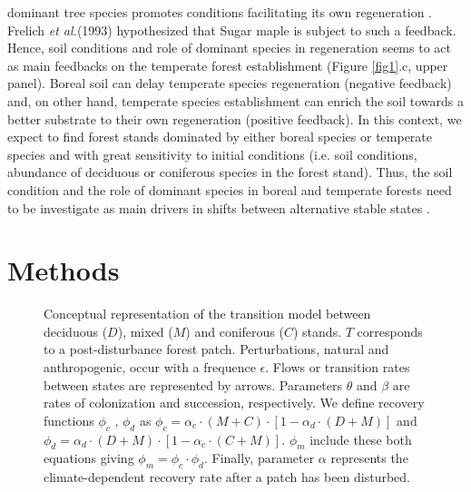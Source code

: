 dominant tree species promotes conditions facilitating its own regeneration
\cite{Barras1998}. Frelich \textit{et al.}(1993) \cite{Society2014}
hypothesized that Sugar maple is subject to such a feedback. Hence, soil
conditions and role of dominant species in regeneration seems to act as main
feedbacks on the temperate forest establishment (Figure \ref{fig1}.c, upper
panel). Boreal soil can delay temperate species regeneration (negative
feedback) and, on other hand, temperate species establishment can enrich the
soil towards a better substrate to their own regeneration (positive feedback).
In this context, we expect to find forest stands dominated by either boreal
species or temperate species and with great sensitivity to initial conditions
(i.e. soil conditions, abundance of deciduous or coniferous
species in the forest stand). Thus, the soil condition and the role of
dominant species in boreal and temperate forests need to be investigate as main
drivers in shifts between alternative stable states
\cite{Kellman2004,Moore2008,DeFrenne2013,Barras1998}.

\section{Methods}

\begin{figure}

\caption{Conceptual representation of the transition model between deciduous ($D$),
mixed ($M$) and coniferous ($C$) stands. $T$ corresponds to a post-disturbance forest patch. Perturbations, natural and anthropogenic, occur with a frequence $\epsilon$.
Flows or transition rates between states are represented by arrows.
Parameters $\theta$ and $\beta$ are rates of colonization and succession,
respectively. We define recovery functions $\phi_c$ , $\phi_d$ as $\phi_c
= \alpha_c \cdot (M+C) \cdot [1- \alpha_d \cdot (D+M)]$ and $\phi_d =
\alpha_d \cdot (D+M) \cdot [1- \alpha_c \cdot (C+M)]$. $\phi_m$ include these both equations giving $\phi_m = \phi_c \cdot \phi_d$. Finally, parameter $\alpha$ represents the climate-dependent recovery rate after a patch has been disturbed.}
\label{Model}
\vspace{-1em}
\end{figure}


%


